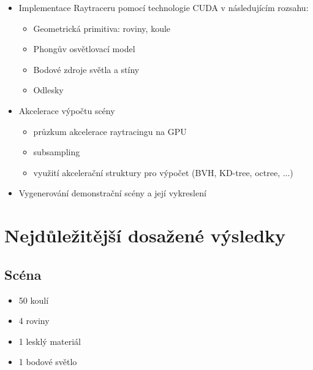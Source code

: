 \documentclass[12pt,a4paper,titlepage,final]{report}
\begin{document}
\begin{itemize}
	\item Implementace Raytraceru pomocí technologie CUDA v následujícím rozsahu:
	\begin{itemize}
		\item Geometrická primitiva: roviny, koule
		\item Phongův osvětlovací model
		\item Bodové zdroje světla a stíny
		\item Odlesky
	\end{itemize}
	\item Akcelerace výpočtu scény
	\begin{itemize}
		\item průzkum akcelerace raytracingu na GPU
		\item subsampling
		\item využití akcelerační struktury pro výpočet (BVH, KD-tree, octree, ...)
	\end{itemize}
	\item Vygenerování demonstrační scény a její vykreslení
\end{itemize}

\chapter{Nejdůležitější dosažené výsledky}

\section{Scéna}
\begin{itemize}
	\item 50 koulí
	\item 4 roviny
	\item 1 lesklý materiál
	\item 1 bodové světlo
\end{itemize}
\end{document}
